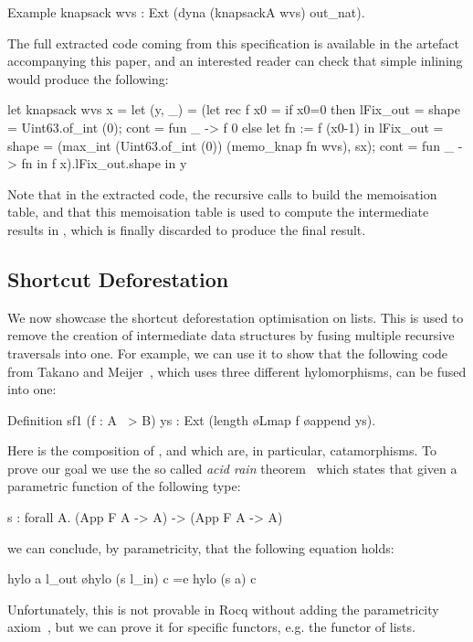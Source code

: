\documentclass[a4paper,UKenglish,cleveref, autoref, thm-restate]{lipics-v2021}
\begin{document}
\begin{coqcode}
Example knapsack wvs : Ext (dyna (knapsackA wvs) out_nat).
\end{coqcode}
The full extracted code coming from this specification is available in the
artefact accompanying this paper, and an interested reader can check that simple
inlining would produce the following:
\begin{ocamlcode}
let knapsack wvs x = let (y, _) = (let rec f x0 =
      if x0=0 then
        { lFix_out = {shape = Uint63.of_int (0); cont  = fun _ -> f 0 } }
      else let fn := f (x0-1) in { lFix_out = {
           shape = (max_int (Uint63.of_int (0)) (memo_knap fn wvs), sx);
           cont = fun _ -> fn } }
     in f x).lFix_out.shape in y
\end{ocamlcode}
Note that in the extracted code, the recursive calls to  build the
memoisation table, and that this memoisation table is used to compute the
intermediate results in , which is finally discarded to produce
the final result.

\subsection{Shortcut Deforestation}\label{sec:shortcut}
We now showcase the shortcut deforestation optimisation on lists.  This is used
to remove the creation of intermediate data structures by fusing multiple
recursive traversals into one.  For example, we can use it to show that the following
code from Takano and
Meijer~\cite{TakanoM95}, which uses three different hylomorphisms, can be fused into one:
\begin{coqcode}
Definition sf1 (f : A ~> B) ys : Ext (length \o Lmap f \o append ys).
\end{coqcode}
Here  is the composition of ,
 and  which are, in particular,
catamorphisms.
To prove our goal we use the so called \emph{acid rain} theorem~\cite{TakanoM95}
which states that given a parametric function of the following type:
\begin{coqcode}
  s  : forall A. (App F A -> A) -> (App F A -> A)
\end{coqcode}
we can conclude, by parametricity, that the following equation holds:
\begin{coqcode}
  hylo a l_out \o hylo (s l_in) c =e hylo (s a) c
\end{coqcode}
Unfortunately, this is not provable in Rocq without adding the parametricity
axiom~\cite{keller_et_al:LIPIcs.CSL.2012.381}, but we can prove it for specific
functors, e.g. the functor of lists.
\end{document}
